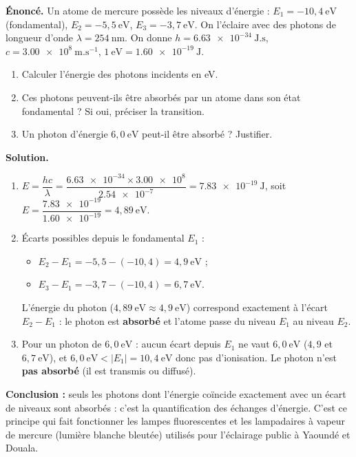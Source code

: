 \documentclass[11pt]{article}
\newcommand{\cle}[1]{{\popxbold\color{popdark}#1}}
\begin{document}
\begin{exoresolu}
\textbf{Énoncé.} Un atome de mercure possède les niveaux d'énergie : $E_1 = -10,4~\text{eV}$ (fondamental), $E_2 = -5,5~\text{eV}$, $E_3 = -3,7~\text{eV}$. On l'éclaire avec des photons de longueur d'onde $\lambda = 254~\text{nm}$. On donne $h = \num{6,63e-34}~\text{J.s}$, $c = \num{3,00e8}~\text{m.s}^{-1}$, $1~\text{eV} = \num{1,60e-19}~\text{J}$.
\begin{enumerate}
\item Calculer l'énergie des photons incidents en eV.
\item Ces photons peuvent-ils être absorbés par un atome dans son état fondamental ? Si oui, préciser la transition.
\item Un photon d'énergie $6,0~\text{eV}$ peut-il être absorbé ? Justifier.
\end{enumerate}
\tcblower
\textbf{Solution.}
\begin{enumerate}
\item $E = \dfrac{hc}{\lambda} = \dfrac{\num{6,63e-34} \times \num{3,00e8}}{\num{2,54e-7}} = \num{7,83e-19}~\text{J}$, soit $E = \dfrac{\num{7,83e-19}}{\num{1,60e-19}} = 4,89~\text{eV}$.
\item Écarts possibles depuis le fondamental $E_1$ :
\begin{itemize}
\item $E_2 - E_1 = -5,5 - (-10,4) = 4,9~\text{eV}$ ;
\item $E_3 - E_1 = -3,7 - (-10,4) = 6,7~\text{eV}$.
\end{itemize}
L'énergie du photon ($4,89~\text{eV} \approx 4,9~\text{eV}$) correspond exactement à l'écart $E_2 - E_1$ : le photon est \textbf{absorbé} et l'atome passe du niveau $E_1$ au niveau $E_2$.
\item Pour un photon de $6,0~\text{eV}$ : aucun écart depuis $E_1$ ne vaut $6,0~\text{eV}$ ($4,9$ et $6,7~\text{eV}$), et $6,0~\text{eV} < |E_1| = 10,4~\text{eV}$ donc pas d'ionisation. Le photon n'est \textbf{pas absorbé} (il est transmis ou diffusé).
\end{enumerate}
\textbf{Conclusion :} seuls les photons dont l'énergie coïncide exactement avec un écart de niveaux sont absorbés : c'est la \cle{quantification} des échanges d'énergie. C'est ce principe qui fait fonctionner les lampes fluorescentes et les lampadaires à vapeur de mercure (lumière blanche bleutée) utilisés pour l'éclairage public à Yaoundé et Douala.
\end{exoresolu}
\end{document}
